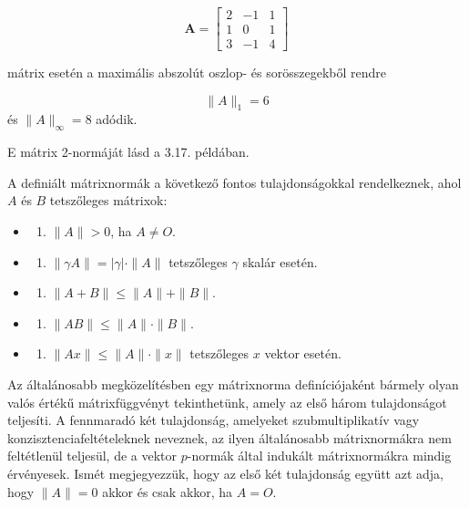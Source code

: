 \documentclass[
  magyar,
  11pt]{article}
\providecommand{\tightlist}{%
  \setlength{\itemsep}{0pt}\setlength{\parskip}{0pt}}
\begin{document}
\[\mathbf{A} = \begin{bmatrix} 2 & -1 & 1 \\ 1 & 0 & 1 \\ 3 & -1 & 4 \end{bmatrix}\]

mátrix esetén a maximális abszolút oszlop- és sorösszegekből rendre

\[\|A\|_1 = 6\] és \(\|A\|_{\infty} = 8\) adódik.

E mátrix 2-normáját lásd a 3.17. példában.

A definiált mátrixnormák a következő fontos tulajdonságokkal
rendelkeznek, ahol \(A\) és \(B\) tetszőleges mátrixok:

\begin{itemize}
\tightlist
\item
  \begin{enumerate}
  \def\labelenumi{\arabic{enumi}.}
  \tightlist
  \item
    \(\|A\| > 0\), ha \(A \neq O\).
  \end{enumerate}
\item
  \begin{enumerate}
  \def\labelenumi{\arabic{enumi}.}
  \setcounter{enumi}{1}
  \tightlist
  \item
    \(\|\gamma A\| = |\gamma| \cdot \|A\|\) tetszőleges \(\gamma\)
    skalár esetén.
  \end{enumerate}
\item
  \begin{enumerate}
  \def\labelenumi{\arabic{enumi}.}
  \setcounter{enumi}{2}
  \tightlist
  \item
    \(\|A + B\| \le \|A\| + \|B\|\).
  \end{enumerate}
\item
  \begin{enumerate}
  \def\labelenumi{\arabic{enumi}.}
  \setcounter{enumi}{3}
  \tightlist
  \item
    \(\|AB\| \le \|A\| \cdot \|B\|\).
  \end{enumerate}
\item
  \begin{enumerate}
  \def\labelenumi{\arabic{enumi}.}
  \setcounter{enumi}{4}
  \tightlist
  \item
    \(\|Ax\| \le \|A\| \cdot \|x\|\) tetszőleges \(x\) vektor esetén.
  \end{enumerate}
\end{itemize}

Az általánosabb megközelítésben egy mátrixnorma definíciójaként bármely
olyan valós értékű mátrixfüggvényt tekinthetünk, amely az első három
tulajdonságot teljesíti. A fennmaradó két tulajdonság, amelyeket
szubmultiplikatív vagy konzisztenciafeltételeknek neveznek, az ilyen
általánosabb mátrixnormákra nem feltétlenül teljesül, de a vektor
\(p\)-normák által indukált mátrixnormákra mindig érvényesek. Ismét
megjegyezzük, hogy az első két tulajdonság együtt azt adja, hogy
\(\|A\| = 0\) akkor és csak akkor, ha \(A = O\).
\end{document}
